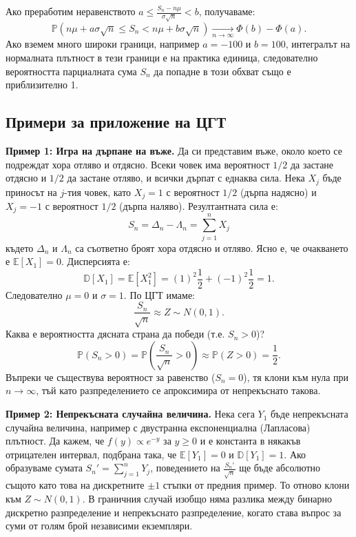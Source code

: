 \documentclass{article}
\begin{document}
Ако преработим неравенството $a \le \frac{S_n - n\mu}{\sigma\sqrt{n}} < b$, получаваме:
\[ \mathbb{P}\left( n\mu + a\sigma\sqrt{n} \le S_n < n\mu + b\sigma\sqrt{n} \right) \xrightarrow[n \to \infty]{} \Phi(b) - \Phi(a). \]
Ако вземем много широки граници, например $a = -100$ и $b = 100$, интегралът на нормалната плътност в тези граници е на практика единица, следователно вероятността парциалната сума $S_n$ да попадне в този обхват също е приблизително 1.

\subsection{Примери за приложение на ЦГТ}

\textbf{Пример 1: Игра на дърпане на въже.}
Да си представим въже, около което се подреждат хора отляво и отдясно. Всеки човек има вероятност $1/2$ да застане отдясно и $1/2$ да застане отляво, и всички дърпат с еднаква сила. Нека $X_j$ бъде приносът на $j$-тия човек, като $X_j = 1$ с вероятност $1/2$ (дърпа надясно) и $X_j = -1$ с вероятност $1/2$ (дърпа наляво). Резултантната сила е:
\[ S_n = \Delta_n - \Lambda_n = \sum_{j=1}^n X_j \]
където $\Delta_n$ и $\Lambda_n$ са съответно броят хора отдясно и отляво. Ясно е, че очакването е $\mathbb{E}[X_1] = 0$. Дисперсията е:
\[ \mathbb{D}[X_1] = \mathbb{E}[X_1^2] = (1)^2 \frac{1}{2} + (-1)^2 \frac{1}{2} = 1. \]
Следователно $\mu=0$ и $\sigma=1$. По ЦГТ имаме:
\[ \frac{S_n}{\sqrt{n}} \approx Z \sim N(0,1). \]
Каква е вероятността дясната страна да победи (т.е. $S_n > 0$)? 
\[ \mathbb{P}(S_n > 0) = \mathbb{P}\left(\frac{S_n}{\sqrt{n}} > 0\right) \approx \mathbb{P}(Z > 0) = \frac{1}{2}. \]
Въпреки че съществува вероятност за равенство ($S_n = 0$), тя клони към нула при $n \to \infty$, тъй като разпределението се апроксимира от непрекъснато такова.

\textbf{Пример 2: Непрекъсната случайна величина.}
Нека сега $Y_1$ бъде непрекъсната случайна величина, например с двустранна експоненциална (Лапласова) плътност. Да кажем, че $f(y) \propto e^{-y}$ за $y \ge 0$ и е константа в някакъв отрицателен интервал, подбрана така, че $\mathbb{E}[Y_1] = 0$ и $\mathbb{D}[Y_1] = 1$. 
Ако образуваме сумата $S_n' = \sum_{j=1}^n Y_j$, поведението на $\frac{S_n'}{\sqrt{n}}$ ще бъде абсолютно същото като това на дискретните $\pm 1$ стъпки от предния пример. То отново клони към $Z \sim N(0,1)$. В граничния случай изобщо няма разлика между бинарно дискретно разпределение и непрекъснато разпределение, когато става въпрос за суми от голям брой независими екземпляри.
\end{document}
